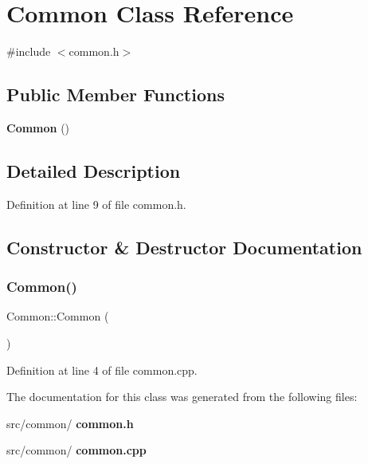 \section{Common Class Reference}
\label{class_common}


{\ttfamily \#include $<$common.\+h$>$}

\subsection*{Public Member Functions}
\begin{DoxyCompactItemize}
\item 
\textbf{ Common} ()
\end{DoxyCompactItemize}


\subsection{Detailed Description}


Definition at line 9 of file common.\+h.



\subsection{Constructor \& Destructor Documentation}
\mbox{\label{class_common_ab0898f6608707a3e07c22d88ecdae661}} 
\subsubsection{Common()}
{\footnotesize\ttfamily Common\+::\+Common (\begin{DoxyParamCaption}{ }\end{DoxyParamCaption})}



Definition at line 4 of file common.\+cpp.



The documentation for this class was generated from the following files\+:\begin{DoxyCompactItemize}
\item 
src/common/\textbf{ common.\+h}\item 
src/common/\textbf{ common.\+cpp}\end{DoxyCompactItemize}
